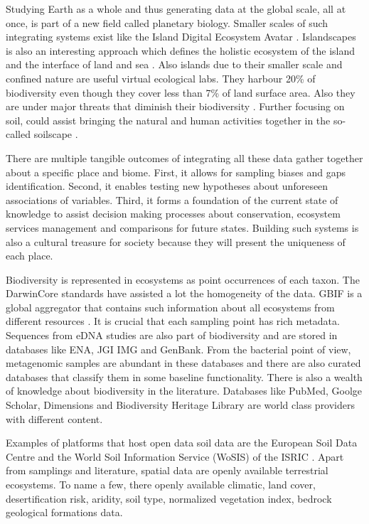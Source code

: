 Studying Earth as a whole and thus generating data at the global scale, all at once,
is part of a new field called planetary biology. Smaller scales of such integrating systems exist like
the Island Digital Ecosystem Avatar \parencite{Davies2016}. Islandscapes 
is also an interesting approach which defines the holistic ecosystem of the island
and the interface of land and sea \parencite{Vogiatzakis_land_2017}. Also islands
due to their smaller scale and confined nature are useful virtual ecological labs. They harbour 20\% of 
biodiversity even though they cover less than 7\% of land surface area. Also they are under major threats 
that diminish their biodiversity \parencite{fernandez-palacios2021scientists}.
Further focusing on soil, could assist bringing the natural and human activities 
together in the so-called soilscape \parencite{LAGACHERIE2001105}.

There are multiple tangible outcomes of integrating all these data gather together about a
specific place and biome. First, it allows for sampling biases and gaps identification. Second, 
it enables testing new hypotheses about unforeseen associations of variables. Third, 
it forms a foundation of the current state of knowledge to assist decision making 
processes about conservation, ecosystem services management and comparisons for 
future states. Building such systems is also a cultural treasure for society because
they will present the uniqueness of each place.

Biodiversity is represented in ecosystems as point occurrences of each taxon. The
DarwinCore standards have assisted a lot the homogeneity of the data. GBIF is a 
global aggregator that contains such information about all ecosystems from 
different resources \parencite{noauthor_gbif_nodate}. It is crucial that each sampling point has rich metadata. 
Sequences from eDNA studies are also part of biodiversity and are stored in 
databases like ENA, JGI IMG and GenBank.
From the bacterial point of view, metagenomic samples are abundant in these 
databases and there are also curated databases that classify them in some baseline functionality. 
There is also a wealth of knowledge about biodiversity in the literature. 
Databases like PubMed, Goolge Scholar, Dimensions and Biodiversity Heritage Library 
are world class providers with different content.

Examples of platforms that host open data soil data are the 
European Soil Data Centre \parencite{Panagos2022} and the World Soil Information
Service (WoSIS) of the ISRIC \parencite{Batjes2024}. Apart from samplings and literature,
spatial data are openly available terrestrial ecosystems.
To name a few, there openly available climatic, land cover, desertification risk, aridity, soil type, normalized
vegetation index, bedrock geological formations data.

